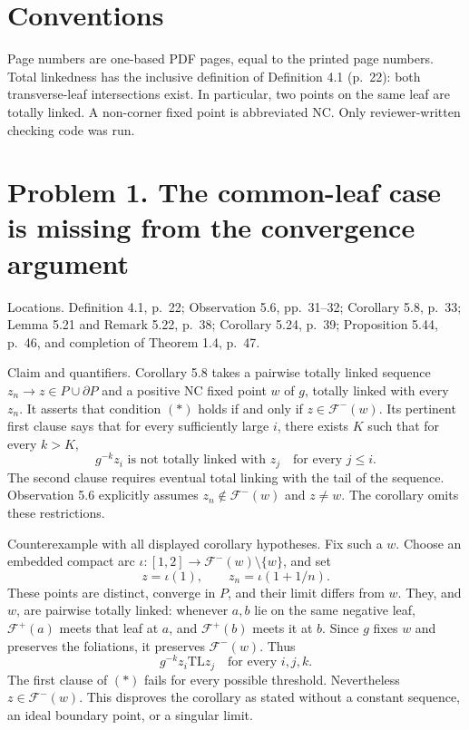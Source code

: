 \documentclass[10pt]{article}
\begin{document}
\section*{Conventions}
Page numbers are one-based PDF pages, equal to the printed page numbers. Total linkedness has the inclusive definition of Definition 4.1 (p. 22): both transverse-leaf intersections exist. In particular, two points on the same leaf are totally linked. A non-corner fixed point is abbreviated NC. Only reviewer-written checking code was run.\par
\section*{Problem 1. The common-leaf case is missing from the convergence argument}
Locations. Definition 4.1, p. 22; Observation 5.6, pp. 31–32; Corollary 5.8, p. 33; Lemma 5.21 and Remark 5.22, p. 38; Corollary 5.24, p. 39; Proposition 5.44, p. 46, and completion of Theorem 1.4, p. 47.\par
Claim and quantifiers. Corollary 5.8 takes a pairwise totally linked sequence \(z_n\to z\in P\cup\partial P\) and a positive NC fixed point \(w\) of \(g\), totally linked with every \(z_n\). It asserts that condition \((*)\) holds if and only if \(z\in\mathcal F^-(w)\). Its pertinent first clause says that for every sufficiently large \(i\), there exists \(K\) such that for every \(k>K\), \[g^{-k}z_i \text{ is not totally linked with }z_j
                    \quad\text{for every }j\leq i.\] The second clause requires eventual total linking with the tail of the sequence. Observation 5.6 explicitly assumes \(z_n\notin\mathcal F^-(w)\) and \(z\ne w\). The corollary omits these restrictions.\par
Counterexample with all displayed corollary hypotheses. Fix such a \(w\). Choose an embedded compact arc \(\iota:[1,2]\to\mathcal F^-(w)\setminus\{w\}\), and set \[z=\iota(1),\qquad z_n=\iota(1+1/n).\] These points are distinct, converge in \(P\), and their limit differs from \(w\). They, and \(w\), are pairwise totally linked: whenever \(a,b\) lie on the same negative leaf, \(\mathcal F^+(a)\) meets that leaf at \(a\), and \(\mathcal F^+(b)\) meets it at \(b\). Since \(g\) fixes \(w\) and preserves the foliations, it preserves \(\mathcal F^-(w)\). Thus \[g^{-k}z_i\mathrel{\mathrm{TL}}z_j
                    \quad\text{for every }i,j,k .\] The first clause of \((*)\) fails for every possible threshold. Nevertheless \(z\in\mathcal F^-(w)\). This disproves the corollary as stated without a constant sequence, an ideal boundary point, or a singular limit.\par
\end{document}
